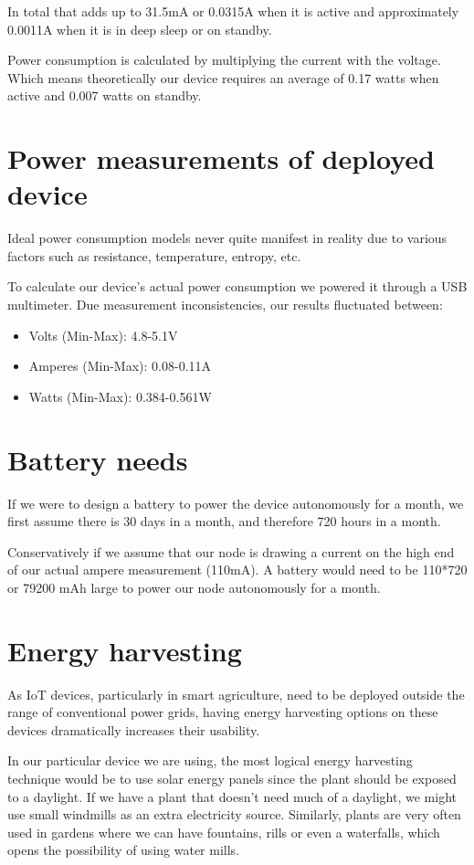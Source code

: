 \documentclass[10pt]{sensys-proc}
\begin{document}
In total that adds up to 31.5mA or 0.0315A when it is active and approximately 0.0011A when it is in deep sleep or on standby. 

Power consumption is calculated by multiplying the current with the voltage.
 Which means theoretically our device requires an average of 0.17 watts when active and 0.007 watts on standby.
\bigskip
\section{Power measurements of deployed device}
Ideal power consumption models never quite manifest in reality due to various factors such as resistance, temperature, entropy, etc. 

To calculate our device's actual power consumption we powered it through a USB multimeter. Due measurement inconsistencies, our results fluctuated between: 
\begin{itemize}
  \item Volts (Min-Max): 4.8-5.1V
  \item Amperes (Min-Max): 0.08-0.11A 
  \item Watts (Min-Max): 0.384-0.561W 
\end{itemize}
\bigskip
\section{Battery needs}
If we were to design a battery to power the device autonomously for a month, we first assume there is 30 days in a month, and therefore 720 hours in a month. 

Conservatively if we assume that our node is drawing a current on the high end of our actual ampere measurement (110mA). A battery would need to be 110*720 or 79200 mAh large to power our node autonomously for a month. 
\bigskip
\section{Energy harvesting}
As IoT devices, particularly in smart agriculture, need to be deployed outside the range of conventional power grids, having energy harvesting options on these devices dramatically increases their usability.
 
In our particular device we are using, the most logical energy harvesting technique would be to use solar energy panels since the plant should be exposed to a daylight. If we have a plant that doesn't need much of a daylight, we might use small windmills as an extra electricity source. Similarly, plants are very often used in gardens where we can have fountains, rills or even a waterfalls, which opens the possibility  of using water mills.
\bigskip
\end{document}
